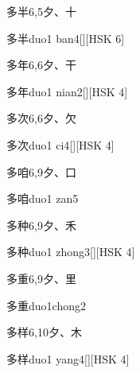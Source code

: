 \begin{Entry}{多半}{6,5}{⼣、⼗}
  \begin{Phonetics}{多半}{duo1 ban4}[][HSK 6]
  \end{Phonetics}
\end{Entry}

\begin{Entry}{多年}{6,6}{⼣、⼲}
  \begin{Phonetics}{多年}{duo1 nian2}[][HSK 4]
  \end{Phonetics}
\end{Entry}

\begin{Entry}{多次}{6,6}{⼣、⽋}
  \begin{Phonetics}{多次}{duo1 ci4}[][HSK 4]
  \end{Phonetics}
\end{Entry}

\begin{Entry}{多咱}{6,9}{⼣、⼝}
  \begin{Phonetics}{多咱}{duo1 zan5}
  \end{Phonetics}
\end{Entry}

\begin{Entry}{多种}{6,9}{⼣、⽲}
  \begin{Phonetics}{多种}{duo1 zhong3}[][HSK 4]
  \end{Phonetics}
\end{Entry}

\begin{Entry}{多重}{6,9}{⼣、⾥}
  \begin{Phonetics}{多重}{duo1chong2}
  \end{Phonetics}
\end{Entry}

\begin{Entry}{多样}{6,10}{⼣、⽊}
  \begin{Phonetics}{多样}{duo1 yang4}[][HSK 4]
  \end{Phonetics}
\end{Entry}

